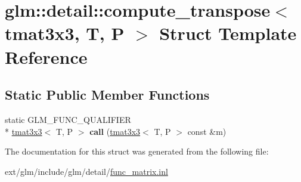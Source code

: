 \hypertarget{structglm_1_1detail_1_1compute__transpose_3_01tmat3x3_00_01_t_00_01_p_01_4}{\section{glm\-:\-:detail\-:\-:compute\-\_\-transpose$<$ tmat3x3, T, P $>$ Struct Template Reference}
\label{structglm_1_1detail_1_1compute__transpose_3_01tmat3x3_00_01_t_00_01_p_01_4}
}
\subsection*{Static Public Member Functions}
\begin{DoxyCompactItemize}
\item 
\hypertarget{structglm_1_1detail_1_1compute__transpose_3_01tmat3x3_00_01_t_00_01_p_01_4_ac265563c5d676e2e529371d72ee11db5}{static G\-L\-M\-\_\-\-F\-U\-N\-C\-\_\-\-Q\-U\-A\-L\-I\-F\-I\-E\-R \\*
\hyperlink{structglm_1_1tmat3x3}{tmat3x3}$<$ T, P $>$ {\bfseries call} (\hyperlink{structglm_1_1tmat3x3}{tmat3x3}$<$ T, P $>$ const \&m)}\label{structglm_1_1detail_1_1compute__transpose_3_01tmat3x3_00_01_t_00_01_p_01_4_ac265563c5d676e2e529371d72ee11db5}

\end{DoxyCompactItemize}


The documentation for this struct was generated from the following file\-:\begin{DoxyCompactItemize}
\item 
ext/glm/include/glm/detail/\hyperlink{func__matrix_8inl}{func\-\_\-matrix.\-inl}\end{DoxyCompactItemize}
